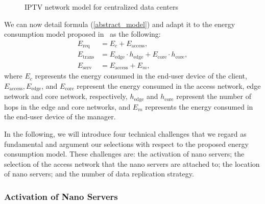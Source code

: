 \begin{figure}[h]
	\fontsize{12}{12} \selectfont
	\centerline{\resizebox{15cm}{!}{}}
	\caption{IPTV network model for centralized data centers~\cite{iptv}}
	\label{fig:ipnet}
	\normalsize
\end{figure}

We can now detail formula (\ref{abstract_model}) and adapt it to the energy consumption model proposed in~\cite{DBLP:journals/sigmetrics/JalaliAVHAT14} as the following:
\begin{align}
E_\text{req}&=E_{c}+E_\text{access},\\
E_\text{trans}&=E_\text{edge}\cdot h_\text{edge}+E_\text{core}\cdot h_\text{core},\\
E_\text{serv}&=E_\text{access}+ E_{m},
\end{align} 
where $E_c$ represents the energy consumed in the end-user device of the client, 
$E_\text{access}, E_\text{edge}$, and $E_\text{core}$ represent the energy consumed in the access network, edge network and core network, respectively, 
$h_\text{edge}$ and $h_\text{core}$ represent the number of hops in the edge and core networks,
and $E_m$ represents the energy consumed in the end-user device of the manager.

In the following, we will introduce four technical challenges that we regard as fundamental and argument our selections with respect to the proposed energy consumption model.
These challenges are:
the activation of nano servers;
the selection of the access network that the nano servers are attached to; 
the location of nano servers;
and the number of data replication strategy.

\subsubsection{Activation of Nano Servers}

